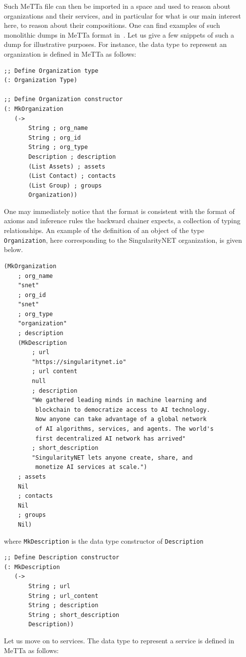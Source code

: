 \documentclass[]{report}
\begin{document}
Such MeTTa file can then be imported in a space and used to reason
about organizations and their services, and in particular for what is
our main interest here, to reason about their compositions.  One can
find examples of such monolithic dumps in MeTTa format in~\cite{TODO}.
Let us give a few snippets of such a dump for illustrative purposes.
For instance, the data type to represent an organization is defined in
MeTTa as follows:
\begin{verbatim}
;; Define Organization type
(: Organization Type)

;; Define Organization constructor
(: MkOrganization
   (->
       String ; org_name
       String ; org_id
       String ; org_type
       Description ; description
       (List Assets) ; assets
       (List Contact) ; contacts
       (List Group) ; groups
       Organization))
\end{verbatim}
One may immediately notice that the format is consistent with the
format of axioms and inference rules the backward chainer expects, a
collection of typing relationships.  An example of the definition of
an object of the type \texttt{Organization}, here
corresponding to the SingularityNET organization, is given below.
\begin{verbatim}
(MkOrganization
    ; org_name
    "snet"
    ; org_id
    "snet"
    ; org_type
    "organization"
    ; description
    (MkDescription
        ; url
        "https://singularitynet.io"
        ; url content
        null
        ; description
        "We gathered leading minds in machine learning and
         blockchain to democratize access to AI technology.
         Now anyone can take advantage of a global network
         of AI algorithms, services, and agents. The world's
         first decentralized AI network has arrived"
        ; short_description
        "SingularityNET lets anyone create, share, and
         monetize AI services at scale.")
    ; assets
    Nil
    ; contacts
    Nil
    ; groups
    Nil)
\end{verbatim}
where \texttt{MkDescription} is the data type constructor
of \texttt{Description}
\begin{verbatim}
;; Define Description constructor
(: MkDescription
   (->
       String ; url
       String ; url_content
       String ; description
       String ; short_description
       Description))
\end{verbatim}
Let us move on to services.  The data type to represent a service is
defined in MeTTa as follows:
\end{document}
